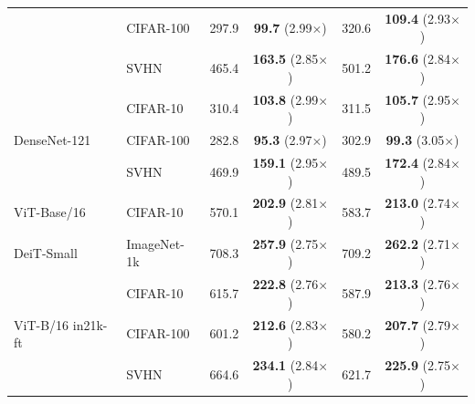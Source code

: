 \begin{table}[t]
\begin{tabular}{ll cc cc}
 & CIFAR-100 & 297.9 & \textbf{99.7} (2.99$\times$) & 320.6 & \textbf{109.4} (2.93$\times$) \\
 & SVHN & 465.4 & \textbf{163.5} (2.85$\times$) & 501.2 & \textbf{176.6} (2.84$\times$) \\
\midrule
\multirow{3}{*}{DenseNet-121} & CIFAR-10 & 310.4 & \textbf{103.8} (2.99$\times$) & 311.5 & \textbf{105.7} (2.95$\times$) \\
 & CIFAR-100 & 282.8 & \textbf{95.3} (2.97$\times$) & 302.9 & \textbf{99.3} (3.05$\times$) \\
 & SVHN & 469.9 & \textbf{159.1} (2.95$\times$) & 489.5 & \textbf{172.4} (2.84$\times$) \\
\midrule
ViT-Base/16 & CIFAR-10 & 570.1 & \textbf{202.9} (2.81$\times$) & 583.7 & \textbf{213.0} (2.74$\times$) \\
\midrule
DeiT-Small & ImageNet-1k & 708.3 & \textbf{257.9} (2.75$\times$) & 709.2 & \textbf{262.2} (2.71$\times$) \\
\midrule
\multirow{3}{*}{ViT-B/16 in21k-ft} & CIFAR-10 & 615.7 & \textbf{222.8} (2.76$\times$) & 587.9 & \textbf{213.3} (2.76$\times$) \\
 & CIFAR-100 & 601.2 & \textbf{212.6} (2.83$\times$) & 580.2 & \textbf{207.7} (2.79$\times$) \\
 & SVHN & 664.6 & \textbf{234.1} (2.84$\times$) & 621.7 & \textbf{225.9} (2.75$\times$) \\
\bottomrule
\end{tabular}

\end{table}
